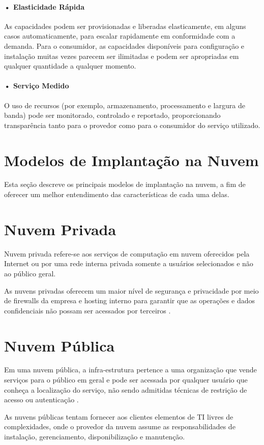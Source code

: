 \documentclass[portuguese,oneside]{tcc}
\begin{document}
\paragraph*{• Elasticidade Rápida}
As capacidades podem ser provisionadas e liberadas elasticamente, em alguns casos automaticamente, para escalar rapidamente em conformidade com a demanda.
Para o consumidor, as capacidades disponíveis para configuração e instalação muitas vezes parecem ser ilimitadas e podem ser apropriadas em qualquer quantidade a qualquer momento.

\paragraph*{• Serviço Medido}
O uso de recursos (por exemplo, armazenamento, processamento e largura de banda) pode ser monitorado, controlado e reportado, proporcionando transparência tanto para o provedor como para o consumidor do serviço utilizado.

\section{Modelos de Implantação na Nuvem}
Esta seção descreve os principais modelos de implantação na nuvem, a fim de oferecer um melhor entendimento das características de cada uma delas. 

\section{Nuvem Privada}
Nuvem privada refere-se aos serviços de computação em nuvem oferecidos pela Internet ou por uma rede interna privada somente a usuários selecionados e não ao público geral.

As nuvens privadas oferecem um maior nível de segurança e privacidade por meio de firewalls da empresa e hosting interno para garantir que as operações e dados confidenciais não possam ser acessados por terceiros \cite{OQUEENUVEM}.

\section{Nuvem Pública}
Em uma nuvem pública, a infra-estrutura pertence a uma  organização que vende serviços para o público em geral e pode  ser acessada por qualquer usuário que conheça a localização do  serviço, não sendo admitidas técnicas de restrição de acesso ou autenticação \cite{COMPUTACAOEMNUVEM}.

As nuvens públicas tentam fornecer aos clientes elementos de  TI livres de complexidades, onde o provedor da nuvem assume  as responsabilidades de instalação, gerenciamento, disponibilização e manutenção.  
\end{document}
